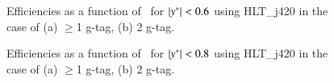 \begin{figure}[htbp]
        \centering
        \caption{Efficiencies as a function of \mjj\ for $|y^\ast|<0.6$ using HLT\_j420 in the case of (a) $\geq$1 g-tag, (b) 2 g-tag.}
        \label{fig: mass turn-on yStar 0.6}
\end{figure}

\begin{figure}[htbp]
        \centering
        \caption{Efficiencies as a function of \mjj\ for $|y^\ast|<0.8$ using HLT\_j420 in the case of (a) $\geq$1 g-tag, (b) 2 g-tag.}
        \label{fig: mass turn-on yStar 0.8}
\end{figure}

